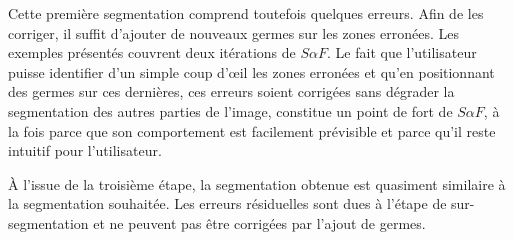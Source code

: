 Cette première segmentation comprend toutefois quelques erreurs. Afin de les corriger, il suffit d'ajouter de nouveaux germes sur les zones erronées. Les exemples présentés couvrent deux itérations de $S \alpha F$. Le fait que l'utilisateur puisse identifier d'un simple coup d’œil les zones erronées et qu'en positionnant des germes sur ces dernières, ces erreurs soient corrigées sans dégrader la segmentation des autres parties de l'image, constitue un point de fort de $S \alpha F$, à la fois parce que son comportement est facilement prévisible et parce qu'il reste intuitif pour l'utilisateur.

À l'issue de la troisième étape, la segmentation obtenue est quasiment similaire à la segmentation souhaitée. Les erreurs résiduelles sont dues à l'étape de sur-segmentation et ne peuvent pas être corrigées par l'ajout de germes.

